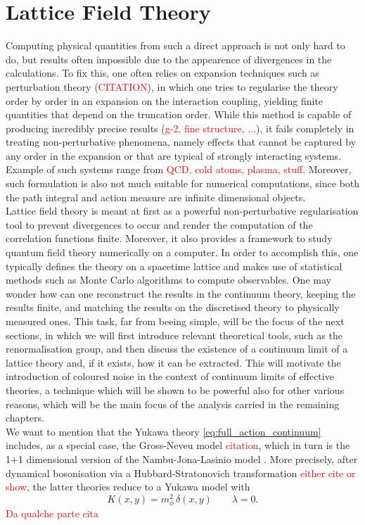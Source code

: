 \section{Lattice Field Theory}
\vspace{20pt}
Computing physical quantities from such a direct approach is not only hard to do, but results often impossible due to the appearence of divergences in the calculations. To fix this, one often relies on expansion techniques such as perturbation theory (\textcolor{red}{CITATION}), in which one tries to regularise the theory order by order in an expansion on the interaction coupling, yielding finite quantities that depend on the truncation order.  While this method is capable of producing incredibly precise results (\textcolor{red}{g-2, fine structure, ...}), it fails completely in treating non-perturbative phenomena, namely effects that cannot be captured by any order in the expansion or that are typical of strongly interacting systems. Example of such systems range from \textcolor{red}{QCD, cold atoms, plasma, stuff}. 
Moreover, such formulation is also not much suitable for numerical computations, since both the path integral and action measure are infinite dimensional objects. \\
Lattice field theory \cite{Montvay1994QuantumLattice,rothe_LGT,gattringer_LQCD,creutz_2023} is meant at first as a powerful non-perturbative regularisation tool to prevent divergences to occur and render the computation of the correlation functions finite. Moreover, it also provides a framework to study quantum field theory numerically on a computer. In order to accomplish this, one typically defines the theory on a spacetime lattice and makes use of statistical methods such as Monte Carlo algorithms to compute observables. One may wonder how can one reconstruct the results in the continuum theory, keeping the results finite, and matching the results on the discretised theory to physically measured ones. This task, far from beeing simple, will be the focus of the next sections, in which we will first introduce relevant theoretical tools, such as the renormalisation group, and then discuss the existence of a continuum limit of a lattice theory and, if it exists, how it can be extracted. This will motivate the introduction of coloured noise in the context of continuum limits of effective theories, a technique which will be shown to be powerful also for other various reasons, which will be the main focus of the analysis carried in the remaining chapters. \\
We want to mention that the Yukawa theory \eqref{eq:full_action_continuum} includes, as a special case, the Gross-Neveu model \textcolor{red}{citation}, which in turn is the 1+1 dimensional version of the Nambu-Jona-Lasinio model \cite{Nambu1961DynamicalI, Nambu1961DynamicalII}.
More precisely, after dynamical bosonisation via a Hubbard-Stratonovich transformation \textcolor{red}{either cite or show}, the latter theories reduce to a Yukawa model with 
\begin{equation*}
    K(x,y) = m_\phi^2 \, \delta(x,y) \qquad \lambda = 0.
\end{equation*}
\textcolor{red}{Da qualche parte cita \cite{carosso2020novel}}

